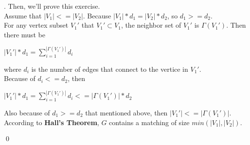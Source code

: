 \documentclass[12pt, notitlepage]{article}
\newenvironment{sol}
  {\par\vspace{3mm}\noindent{\it Solution}.}{\qed}
\begin{document}
\begin{sol}
Then, we'll prove this exercise.\\
Assume that $|V_1| <= |V_2|$. Because $|V_1|*d_1 = |V_2|*d_2$, so $d_1 >= d_2$.\\
For any vertex subset $V_1'$ that $V_1'\subset V_1$, the neighbor set of $V_1'$ is $\Gamma (V_1')$. Then there must be 
\centerline{$|V_1'|*d_1 = \sum\limits^{|\Gamma (V_1')|}_{i=1}d_i$}
where $d_i$ is the number of edges that connect to the vertice in $V_1'$.\\
Because of $d_i <= d_2$, then\\ 
\centerline{$|V_1'|*d_1 = \sum\limits^{|\Gamma (V_1')|}_{i=1}d_i <= |\Gamma (V_1')| * d_2$}
Also because of $d_1 >= d_2$ that mentioned above, then $|V_1'| <= |\Gamma (V_1')|$.\\
According to \textbf{Hall's Theorem},  $G$ contains a matching of size $min(|V_1|, |V_2|)$.

\end{sol}
\end{document}
